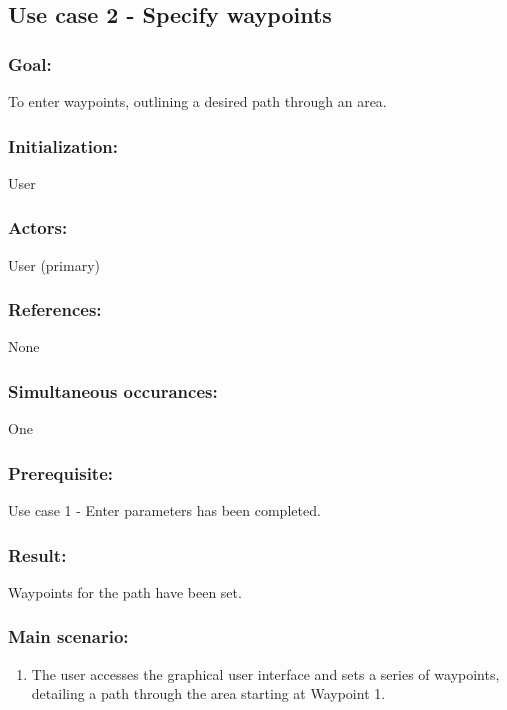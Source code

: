 \begin{framed}
	\subsection{Use case 2 - Specify waypoints}
	\subsubsection*{Goal:}
	To enter waypoints, outlining a desired path through an area.
	
	\subsubsection*{Initialization:}
	User
	
	\subsubsection*{Actors:}
	User (primary)
	
	\subsubsection*{References:}
	None
	
	\subsubsection*{Simultaneous occurances:}
	One
	
	\subsubsection*{Prerequisite:}
	Use case 1 - Enter parameters has been completed.
	
	\subsubsection*{Result:}
	Waypoints for the path have been set.
	
	\subsubsection*{Main scenario:}
	\begin{enumerate}
		\item The user accesses the graphical user interface and sets a series of waypoints, detailing a path through the area starting at Waypoint 1.
	\end{enumerate}	
\end{framed}

